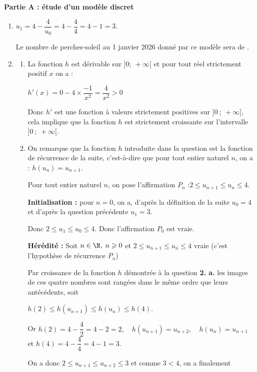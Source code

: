 	\textbf{Partie A : étude d'un modèle discret}
	
	\begin{enumerate}
	\item $u_{1}=4-\dfrac{4}{u_{0}}= 4 - \dfrac{4}{4}=4-1=3$.

Le nombre de perches-soleil au 1 janvier 2026 donné par ce modèle sera de .

\item 
	\begin{enumerate}
		\item La fonction $h$ est dérivable sur $] 0;~+\infty[$ et pour tout réel strictement positif $x$ on a :

$h'(x) = 0 -4 \times \dfrac{-1}{x^2}= \dfrac{4}{x^2} > 0$

Donc $h'$ est une fonction à valeurs strictement positives sur $]0~;~+\infty[$, cela implique que la fonction $h$ est strictement croissante sur l'intervalle $]0~;~+\infty[$.
		\item On remarque que la fonction $h$ introduite dans la question est la fonction de récurrence de la suite, c'est-à-dire que pour tout entier naturel $n$, on a : \quad $h(u_n) = u_{n+1}$.

Pour tout entier naturel $n$, on pose l'affirmation $P_n$ :\quad \og $2 \leqslant u_{n+1} \leqslant u_{n} \leqslant 4$.\fg{}

\textbf{Initialisation : } pour $n = 0$, on a, d'après la définition de la suite $u_0 = 4$ et d'après la question précédente $u_1 = 3$.

Donc \quad $2 \leqslant u_1 \leqslant u_0 \leqslant 4$. \quad Donc l'affirmation $P_0$ est vraie.

\textbf{Hérédité :} Soit $n\in \N, \; n \geqslant 0$ et $2 \leqslant u_{n+1} \leqslant u_{n} \leqslant 4$ vraie (c'est l'hypothèse de récurrence $P_n$)

Par croissance de la fonction $h$ démontrée à la question \textbf{2. a.} les images de ces quatre nombres sont rangées dans le même ordre que leurs antécédents, soit

$h(2) \leqslant h(u_{n+1}) \leqslant h(u_n) \leqslant h(4)$.

Or $h(2) = 4 - \dfrac42  = 4 - 2 = 2, \quad h(u_{n+1}) = u_{n+2}, \quad h(u_n) = u_{n+1}$ et \quad $h(4) = 4 - \dfrac 44 = 4 - 1 = 3$.

On a donc $2 \leqslant u_{n+1} \leqslant u_{n+2} \leqslant 3$ et comme $3 < 4$, on a finalement 


\end{enumerate}
\end{enumerate}
